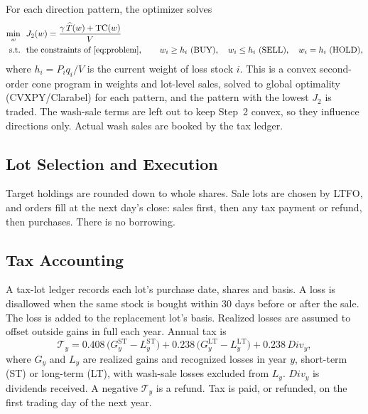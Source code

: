  For each direction pattern, the optimizer solves
\begin{equation}
\begin{aligned}
  \min_w\ \ & J_2(w)=\frac{\gamma\,\widehat T(w)+\mathrm{TC}(w)}{V}\\
  \text{s.t.}\ \ & \text{the constraints of \eqref{eq:problem}},\qquad
  w_i\ge h_i\ (\text{BUY}),\quad w_i\le h_i\ (\text{SELL}),\quad w_i=h_i\ (\text{HOLD}),
\end{aligned}
  \label{eq:stage2}
\end{equation}
where $h_i=P_iq_i/V$ is the current weight of loss stock $i$. This is a convex second-order cone program in weights and lot-level sales, solved to global optimality (CVXPY/Clarabel) for each pattern, and the pattern with the lowest $J_2$ is traded. The wash-sale terms are left out to keep Step~2 convex, so they influence directions only. Actual wash sales are booked by the tax ledger.



\subsection{Lot Selection and Execution}
\label{sec:execution}

Target holdings are rounded down to whole shares. Sale lots are chosen by LTFO, and orders fill at the next day's close: sales first, then any tax payment or refund, then purchases. There is no borrowing.

\subsection{Tax Accounting}
\label{sec:tax}

A tax-lot ledger records each lot's purchase date, shares and basis. A loss is disallowed when the same stock is bought within 30 days before or after the sale. The loss is added to the replacement lot's basis. Realized losses are assumed to offset outside gains in full each year. Annual tax is
\begin{equation}
  \mathcal T_y=0.408\,\big(G^{\mathrm{ST}}_y-L^{\mathrm{ST}}_y\big)+0.238\,\big(G^{\mathrm{LT}}_y-L^{\mathrm{LT}}_y\big)+0.238\,\mathit{Div}_y,
\end{equation}
where $G_y$ and $L_y$ are realized gains and recognized losses in year $y$, short-term (ST) or long-term (LT), with wash-sale losses excluded from $L_y$. $\mathit{Div}_y$ is dividends received. A negative $\mathcal T_y$ is a refund. Tax is paid, or refunded, on the first trading day of the next year.